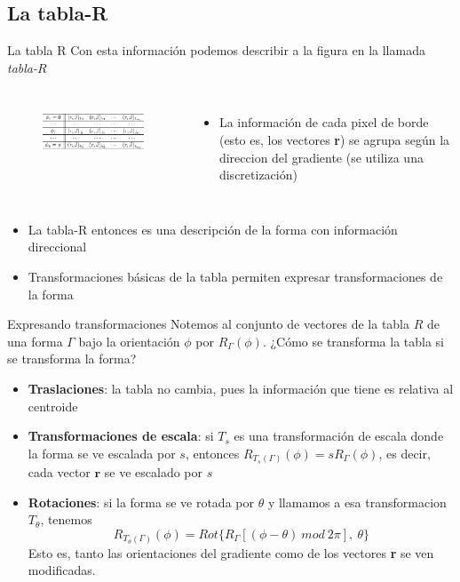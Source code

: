 \documentclass{beamer}
\begin{document}
\subsection{La tabla-R}
\begin{frame}{La tabla R}
Con esta información podemos describir a la figura en la llamada \textit{tabla-$R$}
\begin{columns}[c] %

    \begin{figure}
    \centering
    \includegraphics{rtable}
    \label{fig:my_label}
\end{figure}

\begin{itemize}
    \item La información de cada pixel de borde (esto es, los vectores \textbf{r}) se agrupa según la direccion del gradiente (se utiliza una discretización)
\end{itemize}
\end{columns}
\begin{itemize}
\item La tabla-R entonces es una descripción de la forma con información direccional
\item Transformaciones básicas de la tabla permiten expresar transformaciones de la forma
\end{itemize}

\end{frame}
\begin{frame}{Expresando transformaciones}
Notemos al conjunto de vectores de la tabla $R$ de una forma $\Gamma$ bajo la orientación $\phi$ por $R_\Gamma(\phi)$. ¿Cómo se transforma la tabla si se transforma la forma?
\begin{itemize}
    \item \textbf{Traslaciones}: la tabla no cambia, pues la información que tiene es relativa al centroide
    \item \textbf{Transformaciones de escala}: si $T_s$ es una transformación de escala donde la forma se ve escalada por $s$, entonces $R_{T_s(\Gamma)}(\phi) = sR_\Gamma(\phi)$, es decir, cada vector $\textbf{r}$ se ve escalado por $s$
    \item \textbf{Rotaciones}: si la forma se ve rotada por $\theta$ y llamamos a esa transformacion $T_\theta$, tenemos \[ R_{T_\theta(\Gamma)}(\phi) = Rot\{R_\Gamma[(\phi-\theta)\ mod\ 2\pi],\ \theta\} \]
    Esto es, tanto las orientaciones del gradiente como de los vectores \textbf{r} se ven modificadas.
\end{itemize}
\end{frame}
\end{document}
